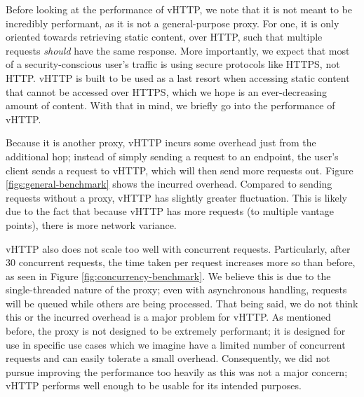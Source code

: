 Before looking at the performance of vHTTP, we note that it is not meant to be
incredibly performant, as it is not a general-purpose proxy. For one, it is
only oriented towards retrieving static content, over HTTP, such that multiple
requests \emph{should} have the same response. More importantly, we expect that
most of a security-conscious user's traffic is using secure protocols like
HTTPS, not HTTP. vHTTP is built to be used as a last resort when accessing
static content that cannot be accessed over HTTPS, which we hope is an
ever-decreasing amount of content. With that in mind, we briefly go into the
performance of vHTTP.

Because it is another proxy, vHTTP incurs some overhead just from the
additional hop; instead of simply sending a request to an endpoint, the user's
client sends a request to vHTTP, which will then send more requests out.
Figure \ref{figs:general-benchmark} shows the incurred overhead. Compared to
sending requests without a proxy, vHTTP has slightly greater fluctuation. This
is likely due to the fact that because vHTTP has more requests (to multiple
vantage points), there is more network variance.

vHTTP also does not scale too well with concurrent requests. Particularly,
after 30 concurrent requests, the time taken per request increases more so
than before, as seen in Figure \ref{fig:concurrency-benchmark}. We believe this
is due to the single-threaded nature of the proxy; even with asynchronous
handling, requests will be queued while others are being processed. That being
said, we do not think this or the incurred overhead is a major problem for
vHTTP. As mentioned before, the proxy is not designed to be extremely
performant; it is designed for use in specific use cases which we imagine have
a limited number of concurrent requests and can easily tolerate a small
overhead. Consequently, we did not pursue improving the performance too heavily
as this was not a major concern; vHTTP performs well enough to be usable for
its intended purposes.



